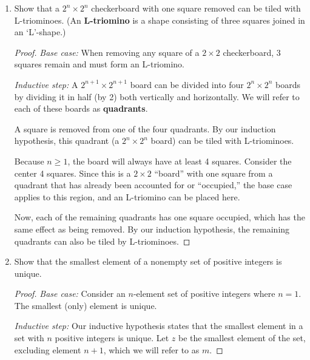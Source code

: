 \documentclass{article}
\newenvironment{answer}{
\begin{quote}}{
\end{quote}}
\begin{document}
\begin{enumerate}
\begin{answer}
\begin{proof}
        \begin{align*}
          \frac{1}{1 \cdot 2} + \frac{1}{2 \cdot 3} &+ \ldots +
          \frac{1}{n(n+1)} + \frac{1}{(n+1)(n+2)}\\
          &= \frac{n}{n+1} + \frac{1}{(n+1)(n+2)} \\
          &= \frac{n(n+2)+1}{(n+1)(n+2)} \\
          &= \frac{n^2+2n+1}{(n+1)(n+2)} \\
          &= \frac{n+1}{n+2}
          .
        \end{align*}
      \end{proof}
    \end{answer}

  \item Show that a $2^n \times 2^n$ checkerboard with one square
    removed can be tiled with L-triominoes. (An \textbf{L-triomino}
    is a shape consisting of three squares joined in an `L'-shape.)

    \begin{proof}
      \textit{Base case:} When removing any square of a $2\times 2$ checkerboard, 3 squares remain and must form an L-triomino.

      \textit{Inductive step:} A $2^{n+1}\times 2^{n+1}$ board can be divided into four $2^n \times 2^n$ boards by dividing it in half (by 2) both vertically and horizontally. We will refer to each of these boards as \textbf{quadrants}.

      A square is removed from one of the four quadrants. By our induction hypothesis, this quadrant (a $2^n \times 2^n$ board) can be tiled with L-triominoes. 
      
      Because $n\ge 1$, the board will always have at least 4 squares. Consider the center 4 squares. Since this is a $2\times 2$ ``board'' with one square from a quadrant that has already been accounted for or ``occupied,'' the base case applies to this region, and an L-triomino can be placed here.
      
      Now, each of the remaining quadrants has one square occupied, which has the same effect as being removed. By our induction hypothesis, the remaining quadrants can also be tiled by L-triominoes.
    \end{proof}

  \item Show that the smallest element of a nonempty set of positive
    integers is unique.

    \begin{proof}
      \textit{Base case:} Consider an $n$-element set of positive integers where $n=1$. The smallest (only) element is unique.

      \textit{Inductive step:} Our inductive hypothesis states that the smallest element in a set with $n$ positive integers is unique. Let $z$ be the smallest element of the set, excluding element $n+1$, which we will refer to as $m$.
    \end{proof}

\end{enumerate}
\end{document}
